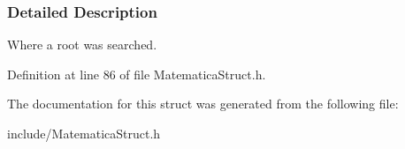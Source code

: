 \subsubsection{\-Detailed \-Description}
\-Where a root was searched. 

\-Definition at line 86 of file \-Matematica\-Struct.\-h.



\-The documentation for this struct was generated from the following file\-:\begin{DoxyCompactItemize}
\item 
include/\-Matematica\-Struct.\-h\end{DoxyCompactItemize}
